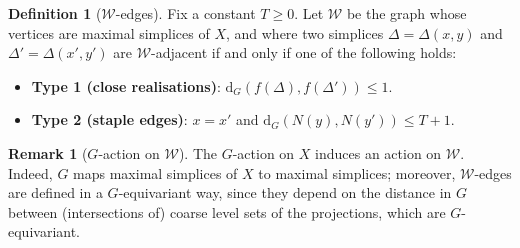 \documentclass[svgnames]{amsart}
\theoremstyle{plain}
\theoremstyle{definition}
\newtheorem{defn}[thm]{Definition}
\newtheorem{rem}[thm]{Remark}
\newcommand{\dist}{\mathrm{d}}
\newcommand{\W}{\mathcal{W}}
\begin{document}
\begin{defn}[$\W$-edges]\label{defn:W-edges}
Fix a constant $T\ge 0$. Let $\W$ be the graph whose vertices are maximal simplices of $X$, and where two simplices $\Delta=\Delta(x,y)$  and $\Delta'=\Delta(x',y')$ are $\W$-adjacent if and only if one of the following holds:
    \begin{itemize}
        \item \textbf{Type 1 (close realisations)}: $\dist_{G}(f(\Delta), f(\Delta'))\le 1$.
        \item \textbf{Type 2 (staple edges)}: $x=x'$ and $\dist_{G}(N(y), N(y'))\le T+1$.
    \end{itemize}
\end{defn}


\begin{rem}[$G$-action on $\W$]\label{rem:G_action_on_W}
    The $G$-action on $X$ induces an action on $\W$. Indeed, $G$ maps maximal simplices of $X$ to maximal simplices; moreover, $\W$-edges are defined in a $G$-equivariant way, since they depend on the distance in $G$ between (intersections of) coarse level sets of the projections, which are $G$-equivariant.
\end{rem}
\end{document}
